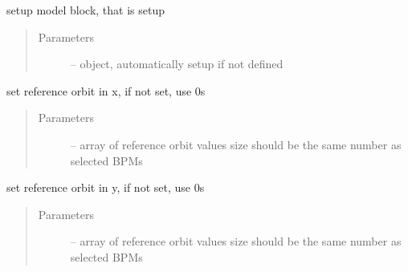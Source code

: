 \documentclass[letterpaper,10pt,english]{sphinxmanual}
\begin{document}
\begin{fulllineitems}
\begin{fulllineitems}
\begin{quote}
\begin{description}
\end{description}\end{quote}

\end{fulllineitems}


\begin{fulllineitems}
\label{\detokenize{src/apidocs/dakopt:genopt.dakopt.DakotaOC.set_model}}
setup model block, that is setup 
\begin{quote}\begin{description}
\item[{Parameters}] \leavevmode
{} --  object, automatically setup if not defined

\end{description}\end{quote}

\end{fulllineitems}


\begin{fulllineitems}
\label{\detokenize{src/apidocs/dakopt:genopt.dakopt.DakotaOC.set_ref_x0}}
set reference orbit in x, if not set, use 0s
\begin{quote}\begin{description}
\item[{Parameters}] \leavevmode
{} -- array of reference orbit values
size should be the same number as selected BPMs

\end{description}\end{quote}

\end{fulllineitems}


\begin{fulllineitems}
\label{\detokenize{src/apidocs/dakopt:genopt.dakopt.DakotaOC.set_ref_y0}}
set reference orbit in y, if not set, use 0s
\begin{quote}\begin{description}
\item[{Parameters}] \leavevmode
{} -- array of reference orbit values
size should be the same number as selected BPMs


\end{description}
\end{quote}
\end{fulllineitems}
\end{fulllineitems}
\end{document}

